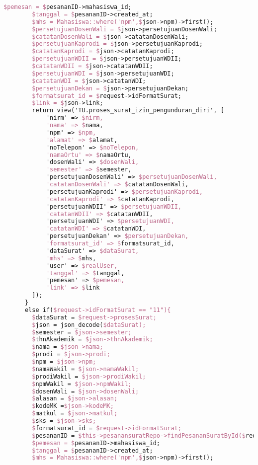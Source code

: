 \begin{lstlisting}[language=tex,basicstyle=\tiny,caption=PesanansuratController.php]
        $pemesan = $pesananID->mahasiswa_id;
        $tanggal = $pesananID->created_at;
        $mhs = Mahasiswa::where('npm',$json->npm)->first();
        $persetujuanDosenWali = $json->persetujuanDosenWali;
        $catatanDosenWali = $json->catatanDosenWali;
        $persetujuanKaprodi = $json->persetujuanKaprodi;
        $catatanKaprodi = $json->catatanKaprodi;
        $persetujuanWDII = $json->persetujuanWDII;
        $catatanWDII = $json->catatanWDII;
        $persetujuanWDI = $json->persetujuanWDI;
        $catatanWDI = $json->catatanWDI;
        $persetujuanDekan = $json->persetujuanDekan;
        $formatsurat_id = $request->idFormatSurat;
        $link = $json->link;
        return view('TU.proses_surat_izin_pengunduran_diri', [
            'nirm' => $nirm,
            'nama' => $nama,
            'npm' => $npm,
            'alamat' => $alamat,
            'noTelepon' => $noTelepon,
            'namaOrtu' => $namaOrtu,
            'dosenWali' => $dosenWali,
            'semester' => $semester,
            'persetujuanDosenWali' => $persetujuanDosenWali,
            'catatanDosenWali' => $catatanDosenWali,
            'persetujuanKaprodi' => $persetujuanKaprodi,
            'catatanKaprodi' => $catatanKaprodi,
            'persetujuanWDII' => $persetujuanWDII,
            'catatanWDII' => $catatanWDII,
            'persetujuanWDI' => $persetujuanWDI,
            'catatanWDI' => $catatanWDI,
            'persetujuanDekan' => $persetujuanDekan,
            'formatsurat_id' => $formatsurat_id,
            'dataSurat' => $dataSurat,
            'mhs' => $mhs,
            'user' => $realUser,
            'tanggal' => $tanggal,
            'pemesan' => $pemesan,
            'link' => $link
        ]);
      }
      else if($request->idFormatSurat == "11"){
        $dataSurat = $request->prosesSurat;
        $json = json_decode($dataSurat);
        $semester = $json->semester;
        $thnAkademik = $json->thnAkademik;
        $nama = $json->nama;
        $prodi = $json->prodi;
        $npm = $json->npm;
        $namaWakil = $json->namaWakil;
        $prodiWakil = $json->prodiWakil;
        $npmWakil = $json->npmWakil;
        $dosenWali = $json->dosenWali;
        $alasan = $json->alasan;
        $kodeMK =$json->kodeMK;
        $matkul = $json->matkul;
        $sks = $json->sks;
        $formatsurat_id = $request->idFormatSurat;
        $pesananID = $this->pesanansuratRepo->findPesananSuratById($request->id);
        $pemesan = $pesananID->mahasiswa_id;
        $tanggal = $pesananID->created_at;
        $mhs = Mahasiswa::where('npm',$json->npm)->first();

\end{lstlisting}
